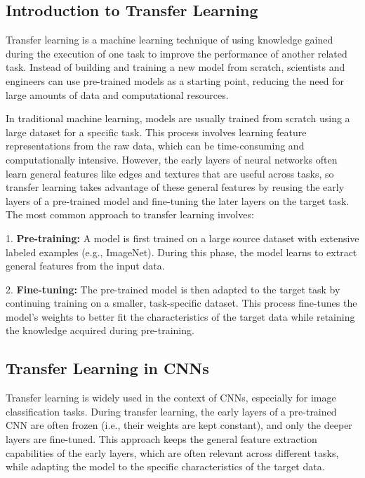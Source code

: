 \subsection{Introduction to Transfer Learning}

Transfer learning is a machine learning technique of using knowledge gained during the execution of one task to improve the performance of another related task. Instead of building and training a new model from scratch, scientists and engineers can use pre-trained models as a starting point, reducing the need for large amounts of data and computational resources.

In traditional machine learning, models are usually trained from scratch using a large dataset for a specific task. This process involves learning feature representations from the raw data, which can be time-consuming and computationally intensive. However, the early layers of neural networks often learn general features like edges and textures that are useful across tasks, so transfer learning takes advantage of these general features by reusing the early layers of a pre-trained model and fine-tuning the later layers on the target task. The most common approach to transfer learning involves:

1. \textbf{Pre-training:} A model is first trained on a large source dataset with extensive labeled examples (e.g., ImageNet). During this phase, the model learns to extract general features from the input data.

2. \textbf{Fine-tuning:} The pre-trained model is then adapted to the target task by continuing training on a smaller, task-specific dataset. This process fine-tunes the model's weights to better fit the characteristics of the target data while retaining the knowledge acquired during pre-training.

\subsection{Transfer Learning in CNNs}

Transfer learning is widely used in the context of CNNs, especially for image classification tasks. During transfer learning, the early layers of a pre-trained CNN are often frozen (i.e., their weights are kept constant), and only the deeper layers are fine-tuned. This approach keeps the general feature extraction capabilities of the early layers, which are often relevant across different tasks, while adapting the model to the specific characteristics of the target data.

